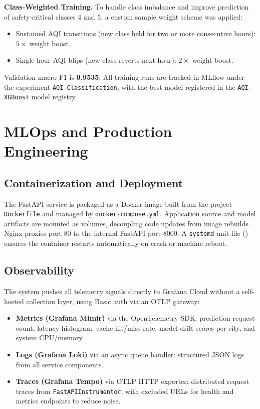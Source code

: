 \documentclass[sigconf, nonacm]{acmart}
\begin{document}
\textbf{Class-Weighted Training.}
To handle class imbalance and improve prediction of
safety-critical classes 4 and 5, a custom sample weight
scheme was applied:
\begin{itemize}
  \item Sustained AQI transitions (new class held for two
        or more consecutive hours): $5\times$ weight boost.
  \item Single-hour AQI blips (new class reverts next
        hour): $2\times$ weight boost.
\end{itemize}
Validation macro F1 is \textbf{0.9535}.  All training runs
are tracked in MLflow under the experiment
\texttt{AQI-Classification}, with the best model registered
in the \texttt{AQI-XGBoost} model registry.

\section{MLOps and Production Engineering}

\subsection{Containerization and Deployment}

The FastAPI service is packaged as a Docker image built
from the project \texttt{Dockerfile} and managed by
\texttt{docker-compose.yml}.  Application source and model
artifacts are mounted as volumes, decoupling code updates
from image rebuilds.  Nginx proxies port 80 to the internal
FastAPI port 8000.  A \texttt{systemd} unit file
() ensures the container
restarts automatically on crash or machine reboot.

\subsection{Observability}

The system pushes all telemetry signals directly to Grafana
Cloud without a self-hosted collection layer, using Basic
auth via an OTLP gateway:

\begin{itemize}
  \item \textbf{Metrics (Grafana Mimir)} via the
        OpenTelemetry SDK: prediction request count,
        latency histogram, cache hit/miss rate, model drift
        scores per city, and system CPU/memory.

  \item \textbf{Logs (Grafana Loki)} via an async queue
        handler: structured JSON logs from all service
        components.

  \item \textbf{Traces (Grafana Tempo)} via OTLP HTTP
        exporter: distributed request traces from
        \texttt{FastAPIInstrumentor}, with excluded URLs
        for health and metrics endpoints to reduce noise.
\end{itemize}
\end{document}
